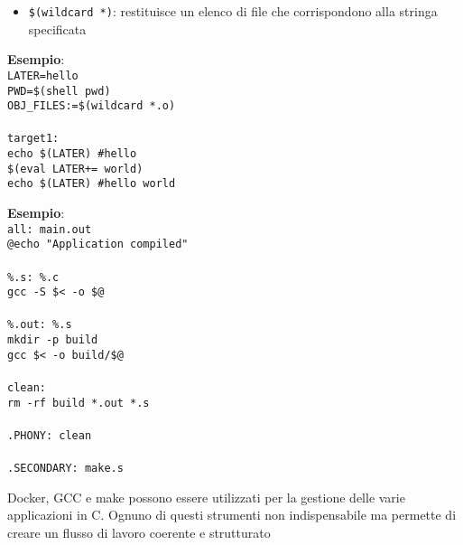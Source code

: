 \begin{flushleft}
\begin{flushleft}
\begin{flushleft}
\begin{itemize}
        \item \texttt{\$(wildcard *)}: restituisce un elenco di file che corrispondono alla stringa specificata
      \end{itemize}
      \textbf{Esempio}: \\
      \texttt{LATER=hello\\
        PWD=\$(shell pwd)\\
        OBJ\_FILES:=\$(wildcard *.o)\\
        \tab \\
        target1:\\
        \tab echo \$(LATER) \#hello\\
        \tab \$(eval LATER+= world)\\
        \tab echo \$(LATER) \#hello world
      }
    \end{flushleft}
  \end{flushleft}
  \begin{flushleft}
    \textbf{Esempio}: \\
    \texttt{all: main.out\\
              \tab @echo "Application compiled"\\
            \tab \\
            \%.s: \%.c\\
              \tab gcc -S \$< -o \$@\\
            \tab \\
            \%.out: \%.s\\
              \tab mkdir -p build \\
              \tab gcc \$< -o build/\$@\\
            \tab \\
            clean: \\
              \tab rm -rf build *.out *.s \\
            \tab \\
            .PHONY: clean\\
            \tab \\
            .SECONDARY: make.s\\
    }
  \end{flushleft}
  Docker, GCC e make possono essere utilizzati per la gestione delle varie applicazioni 
  in C. Ognuno di questi strumenti non \ace indispensabile ma permette di creare un 
  flusso di lavoro coerente e strutturato
\end{flushleft}